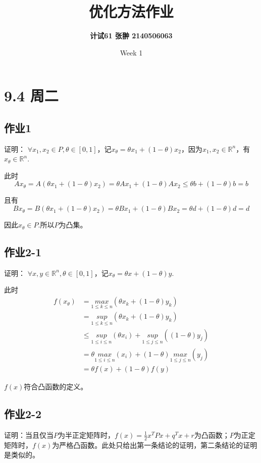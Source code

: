 \documentclass[11pt]{ctexart}
\title{\Large \textbf{优化方法作业}}
\author{\textbf{计试61 张翀 2140506063}}
\date{Week 1}
\begin{document}
\maketitle

\section*{9.4 周二}

\subsection*{作业1}

证明：
$\forall x_1, x_2\in P, \theta\in[0, 1]$，记$x_{\theta}=\theta x_1+(1-\theta)x_2$，因为$x_1, x_2\in \mathbb{R}^n$，有$x_{\theta}\in \mathbb{R}^n$.

此时$$Ax_{\theta}=A(\theta x_1+(1-\theta)x_2)=\theta Ax_1+(1-\theta)Ax_2\leq\theta b+(1-\theta)b=b$$

且有$$Bx_{\theta}=B(\theta x_1+(1-\theta)x_2)=\theta Bx_1+(1-\theta)Bx_2=\theta d+(1-\theta)d=d$$

因此$x_{\theta}\in P$.所以$P$为凸集。


\subsection*{作业2-1}

证明：
$\forall x, y\in \mathbb{R}^n, \theta\in[0, 1]$，记$x_{\theta}=\theta x+(1-\theta)y$.

此时
\begin{align*}
f(x_{\theta}) & =\underset{1\leq k\leq n}{max}(\theta x_k+(1-\theta)y_k) \\
 & =\underset{1\leq k\leq n}{sup}(\theta x_k+(1-\theta)y_k) \\
 & \leq \underset{1\leq i\leq n}{sup}(\theta x_i)+\underset{1\leq j\leq n}{sup}((1-\theta)y_j) \\
 & =\theta \underset{1\leq i\leq n}{max}(x_i)+(1-\theta)\underset{1\leq j\leq n}{max}(y_j) \\
 & =\theta f(x)+(1-\theta)f(y)
\end{align*}

$f(x)$符合凸函数的定义。

\subsection*{作业2-2}

证明：当且仅当$P$为半正定矩阵时，$f(x)=\frac{1}{2}x^TPx+q^Tx+r$为凸函数；$P$为正定矩阵时，$f(x)$为严格凸函数。此处只给出第一条结论的证明，第二条结论的证明是类似的。
\end{document}
